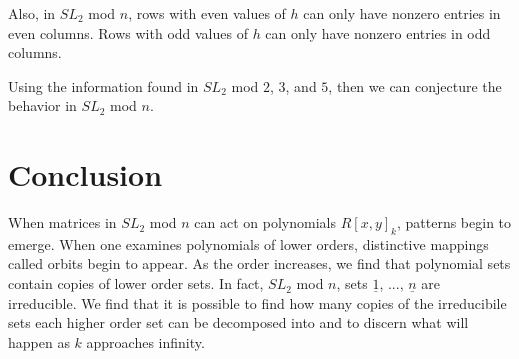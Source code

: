 \documentclass[a4paper,draft]{amsproc}
\theoremstyle{plain}
\theoremstyle{definition}
\theoremstyle{remark}
\numberwithin{equation}{section}
\begin{document}
Also, in $SL_{2}$ mod $n$, rows with even values of $h$ can only have nonzero entries in even columns. Rows with odd values of $h$ can only have nonzero entries in odd columns. 

Using the information found in $SL_{2}$ mod $2$, $3$, and $5$, then we can conjecture the behavior in $SL_{2}$ mod $n$. 

\section{Conclusion}
When matrices in $SL_{2}$ mod $n$ can act on polynomials $R[x,y]_{k}$, patterns begin to emerge. When one examines polynomials of lower orders, distinctive mappings called orbits begin to appear. As the order increases, we find that polynomial sets contain copies of lower order sets.  In fact, $SL_{2}$ mod $n$, sets $\underline{1}$, ..., $\underline{n}$ are irreducible. We find that it is possible to find how many copies of the irreducibile sets each higher order set can be decomposed into and to discern what will happen as $k$ approaches infinity.

\end{document}
